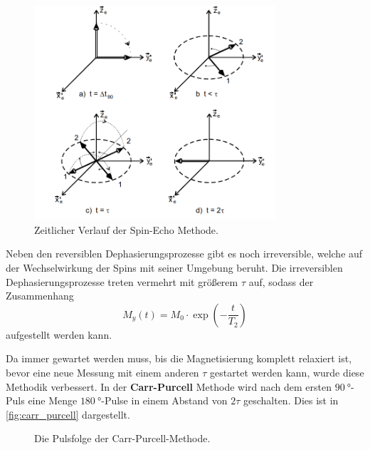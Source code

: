         \begin{figure}
            \centering
            \includegraphics[width=0.8\textwidth]{images/Hahn_echo.png}
            \caption{Zeitlicher Verlauf der Spin-Echo Methode. \cite{finke}}
            \label{fig:hahn}
        \end{figure}

        \noindent Neben den reversiblen Dephasierungsprozesse gibt es noch irreversible, welche auf der Wechselwirkung der Spins mit seiner Umgebung beruht. Die irreversiblen Dephasierungsprozesse 
        treten vermehrt mit größerem $\tau$ auf, sodass der Zusammenhang 
        \begin{equation}
            M_y(t) = M_0 \cdot \exp(-\frac{t}{T_2})
            \label{eqn:expT_2}
        \end{equation}
        aufgestellt werden kann. 
        
        \noindent Da immer gewartet werden muss, bis die Magnetisierung komplett relaxiert ist, bevor eine neue Messung mit einem anderen $\tau$ gestartet werden kann, wurde diese Methodik verbessert. 
        In der \textbf{Carr-Purcell} Methode wird nach dem ersten $\SI{90}{\degree}$-Puls eine Menge $\SI{180}{\degree}$-Pulse in einem Abstand von $2\tau$ geschalten. Dies ist in \autoref{fig:carr_purcell}
        dargestellt. 

        \begin{figure}
            \centering
            \caption{Die Pulsfolge der Carr-Purcell-Methode. \cite{finke}}
            \label{fig:carr_purcell}
        \end{figure}

